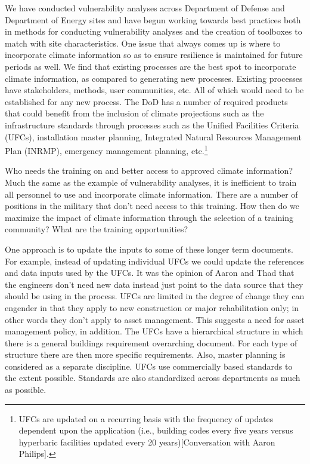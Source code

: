 \documentclass[10pt]{amsart}
\begin{document}
We have conducted vulnerability analyses across Department of Defense and Department of Energy sites and have begun working towards best practices both in methods for conducting vulnerability analyses and the creation of toolboxes to match with site characteristics.
One issue that always comes up is where to incorporate climate information so as to ensure resilience is maintained for future periods as well.
We find that existing processes are the best spot to incorporate climate information, as compared to generating new processes. 
Existing processes have stakeholders, methods, user communities, etc.
All of which would need to be established for any new process.
The DoD has a number of required products that could benefit from the inclusion of climate projections such as the infrastructure standards through processes such as the Unified Facilities Criteria (UFCs), installation master planning, Integrated Natural Resources Management Plan (INRMP), emergency management planning, etc.\footnote{UFCs are updated on a recurring basis with the frequency of updates dependent upon the application (i.e., building codes every five years versus hyperbaric facilities updated every 20 years)[Conversation with Aaron Philips].}

Who needs the training on and better access to approved climate information?
Much the same as the example of vulnerability analyses, it is inefficient to train all personnel to use and incorporate climate information.
There are a number of positions in the military that don't need access to this training.
How then do we maximize the impact of climate information through the selection of a training community?
What are the training opportunities?

One approach is to update the inputs to some of these longer term documents.
For example, instead of updating individual UFCs we could update the references and data inputs used by the UFCs. 
It was the opinion of Aaron and Thad that the engineers don't need new data instead just point to the data source that they should be using in the process.
UFCs are limited in the degree of change they can engender in that they apply to new construction or major rehabilitation only; in other words they don't apply to asset management.
This suggests a need for asset management policy, in addition. 
The UFCs have a hierarchical structure in which there is a general buildings requirement overarching document.
For each type of structure there are then more specific requirements.
Also, master planning is considered as a separate discipline.
UFCs use commercially based standards to the extent possible.
Standards are also standardized across departments as much as possible.
\end{document}
